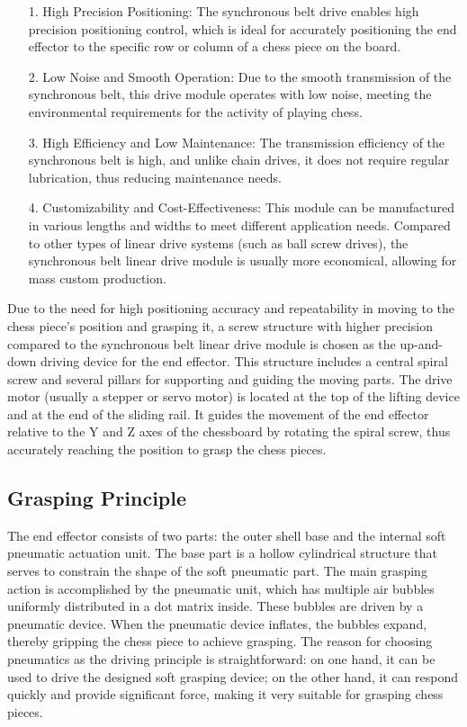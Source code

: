 \documentclass[10pt, a4paper, twocolumn]{article}
\begin{document}
\begin{itemize}
    \item [1.] High Precision Positioning: The synchronous belt drive enables high precision positioning control, which is ideal for accurately positioning the end effector to the specific row or column of a chess piece on the board.
    \item [2. ] Low Noise and Smooth Operation: Due to the smooth transmission of the synchronous belt, this drive module operates with low noise, meeting the environmental requirements for the activity of playing chess.
    \item [3.] High Efficiency and Low Maintenance: The transmission efficiency of the synchronous belt is high, and unlike chain drives, it does not require regular lubrication, thus reducing maintenance needs.
    \item [4.] Customizability and Cost-Effectiveness: This module can be manufactured in various lengths and widths to meet different application needs. Compared to other types of linear drive systems (such as ball screw drives), the synchronous belt linear drive module is usually more economical, allowing for mass custom production.
\end{itemize}

Due to the need for high positioning accuracy and repeatability in moving to the chess piece's position and grasping it, a screw structure with higher precision compared to the synchronous belt linear drive module is chosen as the up-and-down driving device for the end effector. This structure includes a central spiral screw and several pillars for supporting and guiding the moving parts. The drive motor (usually a stepper or servo motor) is located at the top of the lifting device and at the end of the sliding rail. It guides the movement of the end effector relative to the Y and Z axes of the chessboard by rotating the spiral screw, thus accurately reaching the position to grasp the chess pieces.

\subsection{Grasping Principle}
The end effector consists of two parts: the outer shell base and the internal soft pneumatic actuation unit. The base part is a hollow cylindrical structure that serves to constrain the shape of the soft pneumatic part. The main grasping action is accomplished by the pneumatic unit, which has multiple air bubbles uniformly distributed in a dot matrix inside. These bubbles are driven by a pneumatic device. When the pneumatic device inflates, the bubbles expand, thereby gripping the chess piece to achieve grasping. The reason for choosing pneumatics as the driving principle is straightforward: on one hand, it can be used to drive the designed soft grasping device; on the other hand, it can respond quickly and provide significant force, making it very suitable for grasping chess pieces.
\end{document}
